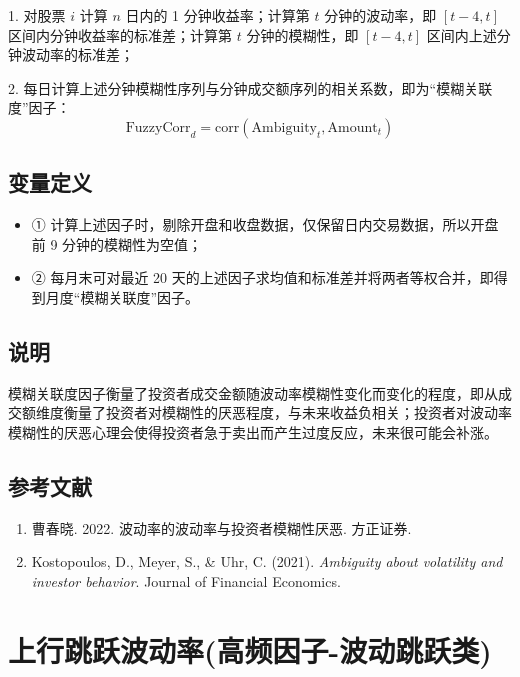 \documentclass{article}
\begin{document}
1. 对股票 \( i \) 计算 \( n \) 日内的 1 分钟收益率；计算第 \( t \) 分钟的波动率，即 \([t-4, t]\) 区间内分钟收益率的标准差；计算第 \( t \) 分钟的模糊性，即 \([t-4, t]\) 区间内上述分钟波动率的标准差；

2. 每日计算上述分钟模糊性序列与分钟成交额序列的相关系数，即为“模糊关联度”因子：
\begin{equation}
    \mathrm{FuzzyCorr}_d = \mathrm{corr}(\mathrm{Ambiguity}_t, \mathrm{Amount}_t)
\end{equation}

\subsection{变量定义}
\begin{itemize}
    \item ① 计算上述因子时，剔除开盘和收盘数据，仅保留日内交易数据，所以开盘前 9 分钟的模糊性为空值；
    \item ② 每月末可对最近 20 天的上述因子求均值和标准差并将两者等权合并，即得到月度“模糊关联度”因子。
\end{itemize}

\subsection{说明}
模糊关联度因子衡量了投资者成交金额随波动率模糊性变化而变化的程度，即从成交额维度衡量了投资者对模糊性的厌恶程度，与未来收益负相关；投资者对波动率模糊性的厌恶心理会使得投资者急于卖出而产生过度反应，未来很可能会补涨。

\subsection{参考文献}
\begin{enumerate}
    \item 曹春晓. 2022. 波动率的波动率与投资者模糊性厌恶. 方正证券.
    \item Kostopoulos, D., Meyer, S., \& Uhr, C. (2021). \textit{Ambiguity about volatility and investor behavior}. Journal of Financial Economics.
\end{enumerate}

\section{上行跳跃波动率(高频因子-波动跳跃类)}
\end{document}
